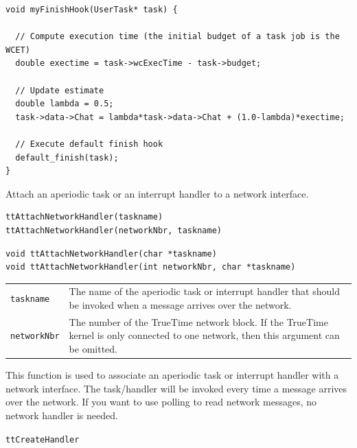 \documentclass[final,twoside]{rapport}
\begin{document}
\begin{small}
\begin{verbatim}
void myFinishHook(UserTask* task) {

  // Compute execution time (the initial budget of a task job is the WCET)
  double exectime = task->wcExecTime - task->budget;

  // Update estimate
  double lambda = 0.5;
  task->data->Chat = lambda*task->data->Chat + (1.0-lambda)*exectime;

  // Execute default finish hook
  default_finish(task);
}
\end{verbatim}
\end{small}



\purpose
Attach an aperiodic task or an interrupt handler to a network interface. 

\Msyntax
\begin{verbatim}
ttAttachNetworkHandler(taskname)
ttAttachNetworkHandler(networkNbr, taskname)
\end{verbatim}

\Csyntax
\begin{verbatim}
void ttAttachNetworkHandler(char *taskname)
void ttAttachNetworkHandler(int networkNbr, char *taskname)
\end{verbatim}

\args
\begin{tabularx}{\hsize}{l>{\raggedright\arraybackslash}X}
  {\tt taskname} & The name of the aperiodic task or interrupt handler that should be
                  invoked when a message arrives over the network.\\
  {\tt networkNbr} &  The number of the TrueTime network block. If the TrueTime
  kernel is only connected to one network, then this argument can be omitted.

\end{tabularx}

\descr This function is used to associate an aperiodic task or interrupt
handler with a network interface. The task/handler will be invoked every time a
message arrives over the network. If you want to use polling to read network
messages, no network handler is needed.

\seealso 
{\tt ttCreateHandler}


\end{document}
